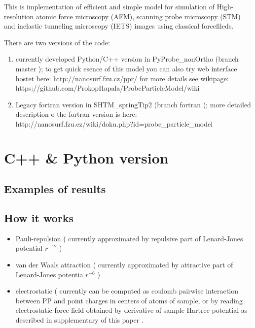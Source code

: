 This is implementation of efficient and simple model for simulation of
High-resolution atomic force microscopy (AFM), scanning probe microscopy (STM)
and inelastic tunneling microscopy (IETS) images using classical forcefileds.

There are two versions of the code:

\begin{enumerate}
   \item currently developed Python/C++ version in PyProbe\_nonOrtho (branch master
    );
        to get quick esence of this model you can also try web interface hostet here: http://nanosurf.fzu.cz/ppr/
        for more details see wikipage:
        https://github.com/ProkopHapala/ProbeParticleModel/wiki
   \item Legacy fortran version in SHTM\_springTip2 (branch fortran );
        more detailed description o the fortran version is here:
        http://nanosurf.fzu.cz/wiki/doku.php?id=probe\_particle\_model
\end{enumerate}
\cite{phapalamechhighresol}
\cite{phapalaoriginhighresol}


\section{C++ \& Python version}

\subsection{Examples of results}


\subsection{How it works}

\begin{itemize}

    \item  Pauli-repulsion ( currently approximated by repulsive part of
    Lenard-Jones potential $r^{-12}$ )
    \item van der Waals attraction ( currently approximated by attractive part
    of Lenard-Jones potentia $r^{-6}$ )
    \item electrostatic ( currently can be computed as coulomb pairwise
    interaction between PP and point charges in centers of atoms of sample, or
    by reading electrostatic force-field obtained by derivative of sample
    Hartree potential as described in supplementary of this paper
    \cite{phapalaoriginhighresol}.

\end{itemize}

